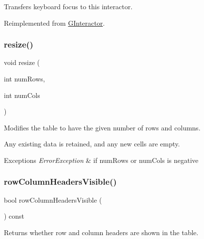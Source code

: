 Transfers keyboard focus to this interactor. 



Reimplemented from \mbox{\hyperlink{classsgl_1_1GInteractor_a519fb2ac767f8b2febbb50b898b8c8cb}{G\+Interactor}}.

\mbox{\label{classsgl_1_1GTable_a600810b1a74ec9a062ce38666a9e7602}} 
\subsubsection{\texorpdfstring{resize()}{resize()}}
{\footnotesize\ttfamily void resize (\begin{DoxyParamCaption}\item[{int}]{num\+Rows,  }\item[{int}]{num\+Cols }\end{DoxyParamCaption})\hspace{0.3cm}{\ttfamily [virtual]}}



Modifies the table to have the given number of rows and columns. 

Any existing data is retained, and any new cells are empty. 
\begin{DoxyExceptions}{Exceptions}
{\em Error\+Exception} & if num\+Rows or num\+Cols is negative \\
\hline
\end{DoxyExceptions}
\mbox{\label{classsgl_1_1GTable_a92c3dff0296ec16823a1172a9f9f07e6}} 
\subsubsection{\texorpdfstring{row\+Column\+Headers\+Visible()}{rowColumnHeadersVisible()}}
{\footnotesize\ttfamily bool row\+Column\+Headers\+Visible (\begin{DoxyParamCaption}{ }\end{DoxyParamCaption}) const\hspace{0.3cm}{\ttfamily [virtual]}}



Returns whether row and column headers are shown in the table. 

